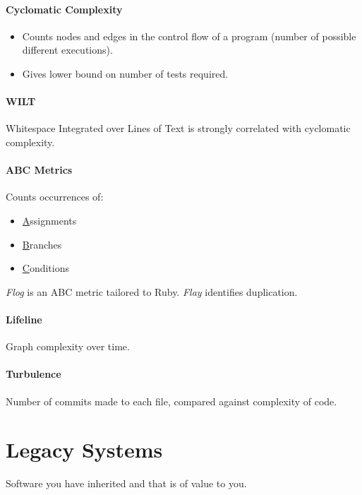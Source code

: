 \documentclass[twocolumn,english]{article}
\begin{document}
\paragraph{Cyclomatic Complexity}
\begin{itemize}
\item Counts nodes and edges in the control flow of a program (number of
possible different executions).
\item Gives lower bound on number of tests required.
\end{itemize}

\paragraph{WILT}

Whitespace Integrated over Lines of Text is strongly correlated with
cyclomatic complexity.

\paragraph{ABC Metrics}

Counts occurrences of:
\begin{itemize}
\item \uline{A}ssignments
\item \uline{B}ranches
\item \uline{C}onditions
\end{itemize}
\emph{Flog} is an ABC metric tailored to Ruby. \emph{Flay} identifies
duplication.

\paragraph{Lifeline}

Graph complexity over time.

\paragraph{Turbulence}

Number of commits made to each file, compared against complexity of
code.

\section{Legacy Systems}

Software you have inherited and that is of value to you.
\end{document}
